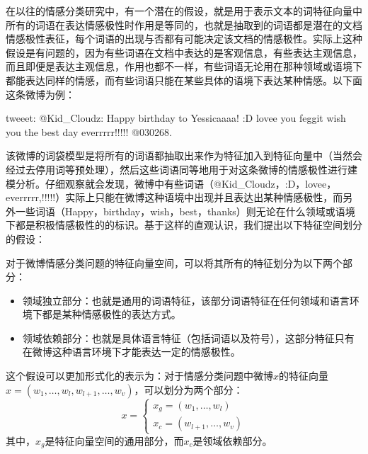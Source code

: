在以往的情感分类研究中，有一个潜在的假设，就是用于表示文本的词特征向量中所有的词语在表达情感极性时作用是等同的，也就是抽取到的词语都是潜在的文档情感极性表征，每个词语的出现与否都有可能决定该文档的情感极性。实际上这种假设是有问题的，因为有些词语在文档中表达的是客观信息，有些表达主观信息，而且即便是表达主观信息，作用也都不一样，有些词语无论用在那种领域或语境下都能表达同样的情感，而有些词语只能在某些具体的语境下表达某种情感。以下面这条微博为例：

\begin{description}
\item{tweeet:} @Kid\_Cloudz: Happy birthday to Yessicaaaa! :D lovee you feggit wish you the best day everrrrr!!!!! @030268.
\end{description}

该微博的词袋模型是将所有的词语都抽取出来作为特征加入到特征向量中（当然会经过去停用词等预处理），然后这些词语同等地用于对这条微博的情感极性进行建模分析。仔细观察就会发现，微博中有些词语（@Kid\_Cloudz，:D，lovee，everrrrr,!!!!!）实际上只能在微博这种语境中出现并且表达出某种情感极性，而另外一些词语（Happy，birthday，wish，best，thanks）则无论在什么领域或语境下都是积极情感极性的的标识。基于这样的直观认识，我们提出以下特征空间划分的假设：
\begin{assumption}[特征空间划分]
\label{hy4-1}
对于微博情感分类问题的特征向量空间，可以将其所有的特征划分为以下两个部分：
\begin{itemize}
\item 领域独立部分：也就是通用的词语特征，该部分词语特征在任何领域和语言环境下都是某种情感极性的表达方式。
\item 领域依赖部分：也就是具体语言特征（包括词语以及符号），这部分特征只有在微博这种语言环境下才能表达一定的情感极性。
\end{itemize}
\end{assumption}
这个假设可以更加形式化的表示为：对于情感分类问题中微博$ x $的特征向量$ x=\left(  w_{1},\dots,w_{l},w_{l+1},\dots,w_{v} \right) $，可以划分为两个部分：
\begin{equation}
\label{e2}
x=\begin{cases}
x_{g}= \left( w_{1},\dots,w_{l}\right)\\
x_{c}= \left( w_{l+1},\dots,w_{v}\right)
\end{cases}
\end{equation}
其中，$ x_{g} $是特征向量空间的通用部分，而$ x_{c} $是领域依赖部分。


